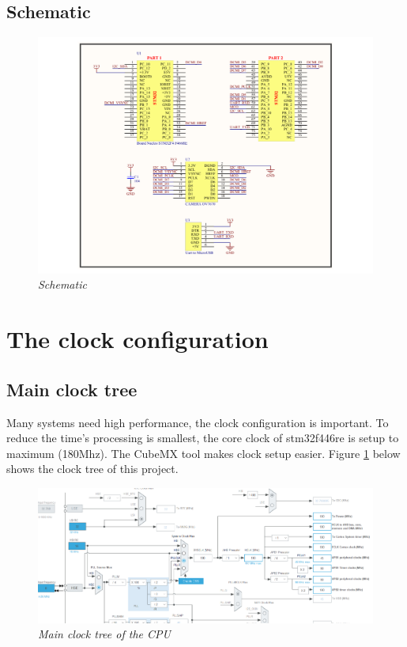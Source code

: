 \documentclass[D:/Latex/Internship/Report/Latex/Report.tex]{subfiles}
\begin{document}
			\subsection{Schematic}
				\begin{figure}[ht!]
					\centering
					\includegraphics[width = 1\linewidth]{Figure/Schematic.pdf}
					\caption{\it Schematic}
				\end{figure}

	\section{The clock configuration}
	\label{sec:The Clock Configuration}
		\subsection{Main clock tree}
		\label{subsec:Main clock tree}
			Many systems need high performance, the clock configuration is important. To reduce the time's processing is smallest, the core clock of stm32f446re is setup to maximum (180Mhz). The CubeMX tool makes clock setup easier. Figure \ref{fig:Main clock tree} below shows the clock tree of this project. \\
			\begin{figure}[ht!]
				\centering
				\includegraphics[scale = 0.3]{Figure/MainClockTree.png}
				\caption{\it Main clock tree of the CPU}
				\label{fig:Main clock tree}
			\end{figure}
\end{document}

